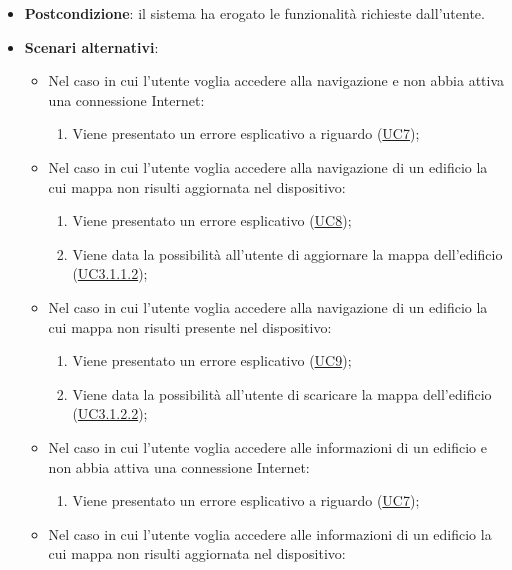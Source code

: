 \documentclass[../AnalisiDeiRequisiti.tex]{subfiles}
\begin{document}
\begin{itemize}
\begin{enumerate}
      \end{enumerate}
    \item \textbf{Postcondizione}: il sistema ha erogato le funzionalità richieste dall'utente.
     \item \textbf{Scenari alternativi}: 
      \begin{itemize}
       \item Nel caso in cui l'utente voglia accedere alla navigazione e non abbia attiva una connessione Internet: 
       \begin{enumerate}
          \item Viene presentato un errore esplicativo a riguardo (\hyperlink{UC7}{UC7});
       \end{enumerate}
       \item Nel caso in cui l'utente voglia accedere alla navigazione di un edificio la cui mappa non risulti aggiornata nel dispositivo: 
       \begin{enumerate}
          \item Viene presentato un errore esplicativo (\hyperlink{UC8}{UC8});
          \item Viene data la possibilità all'utente di aggiornare la mappa dell'edificio (\hyperlink{UC3.1.1.2}{UC3.1.1.2});
       \end{enumerate}
       \item Nel caso in cui l'utente voglia accedere alla navigazione di un edificio la cui mappa non risulti presente nel dispositivo: 
       \begin{enumerate}
          \item Viene presentato un errore esplicativo (\hyperlink{UC9}{UC9});
          \item Viene data la possibilità all'utente di scaricare la mappa dell'edificio (\hyperlink{UC3.1.2.2}{UC3.1.2.2});
       \end{enumerate}
       \item Nel caso in cui l'utente voglia accedere alle informazioni di un edificio e non abbia attiva una connessione Internet: 
       \begin{enumerate}
          \item Viene presentato un errore esplicativo a riguardo (\hyperlink{UC7}{UC7});
       \end{enumerate}
       \item Nel caso in cui l'utente voglia accedere alle informazioni di un edificio la cui mappa non risulti aggiornata nel dispositivo: 
       \begin{enumerate}

\end{enumerate}
\end{itemize}
\end{itemize}
\end{document}
